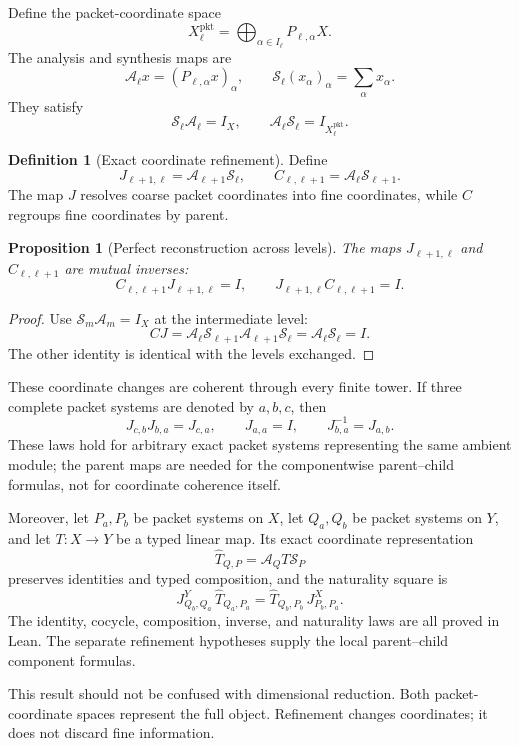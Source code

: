 \documentclass[11pt]{article}
\newtheorem{proposition}[theorem]{Proposition}
\theoremstyle{definition}
\newtheorem{definition}[theorem]{Definition}
\theoremstyle{remark}
\newcommand{\cA}{\mathcal A}
\newcommand{\cS}{\mathcal S}
\begin{document}
Define the packet-coordinate space
\[
X_\ell^{\mathrm{pkt}}
=
\bigoplus_{\alpha\in I_\ell}P_{\ell,\alpha}X.
\]
The analysis and synthesis maps are
\[
\cA_\ell x=(P_{\ell,\alpha}x)_\alpha,
\qquad
\cS_\ell(x_\alpha)_\alpha=\sum_\alpha x_\alpha.
\]
They satisfy
\[
\cS_\ell\cA_\ell=I_X,
\qquad
\cA_\ell\cS_\ell=I_{X_\ell^{\mathrm{pkt}}}.
\]

\begin{definition}[Exact coordinate refinement]\label{def:coordinate-refinement}
Define
\[
J_{\ell+1,\ell}=\cA_{\ell+1}\cS_\ell,
\qquad
C_{\ell,\ell+1}=\cA_\ell\cS_{\ell+1}.
\]
The map $J$ resolves coarse packet coordinates into fine coordinates, while $C$ regroups fine coordinates by parent.
\end{definition}

\begin{proposition}[Perfect reconstruction across levels]\label{prop:perfect-reconstruction}
The maps $J_{\ell+1,\ell}$ and $C_{\ell,\ell+1}$ are mutual inverses:
\[
C_{\ell,\ell+1}J_{\ell+1,\ell}=I,
\qquad
J_{\ell+1,\ell}C_{\ell,\ell+1}=I.
\]
\end{proposition}

\begin{proof}
Use $\cS_m\cA_m=I_X$ at the intermediate level:
\[
C J
=\cA_\ell\cS_{\ell+1}\cA_{\ell+1}\cS_\ell
=\cA_\ell\cS_\ell=I.
\]
The other identity is identical with the levels exchanged.
\end{proof}

These coordinate changes are coherent through every finite tower. If three
complete packet systems are denoted by $a,b,c$, then
\[
J_{c,b}J_{b,a}=J_{c,a},
\qquad J_{a,a}=I,
\qquad J_{b,a}^{-1}=J_{a,b}.
\]
These laws hold for arbitrary exact packet systems representing the same
ambient module; the parent maps are needed for the componentwise
parent--child formulas, not for coordinate coherence itself.

Moreover, let $P_a,P_b$ be packet systems on $X$, let $Q_a,Q_b$ be packet
systems on $Y$, and let $T:X\to Y$ be a typed linear map. Its exact coordinate
representation
\[
\widehat T_{Q,P}=\cA_QT\cS_P
\]
preserves identities and typed composition, and the naturality square is
\[
\boxed{
J^Y_{Q_b,Q_a}\,\widehat T_{Q_a,P_a}
=
\widehat T_{Q_b,P_b}\,J^X_{P_b,P_a}.
}
\]
The identity, cocycle, composition, inverse, and naturality laws are all proved
in Lean. The separate refinement hypotheses supply the local parent--child
component formulas.

This result should not be confused with dimensional reduction. Both packet-coordinate spaces represent the full object. Refinement changes coordinates; it does not discard fine information.
\end{document}

